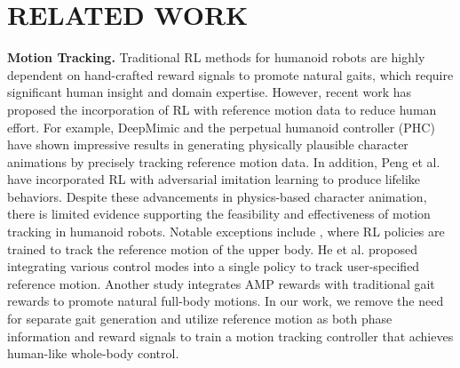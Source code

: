\section{RELATED WORK}
\label{related work}
\textbf{Motion Tracking.} Traditional RL methods for humanoid robots \cite{radosavovic2024real, siekmann2021sim} are highly dependent on hand-crafted reward signals to promote natural gaits, which require significant human insight and domain expertise. However, recent work has proposed the incorporation of RL with reference motion data to reduce human effort. For example, DeepMimic \cite{peng2018deepmimic} and the perpetual humanoid controller (PHC) \cite{luo2023perpetual} have shown impressive results in generating physically plausible character animations by precisely tracking reference motion data. In addition, Peng et al. \cite{peng2021amp, peng2022ase} have incorporated RL with adversarial imitation learning to produce lifelike behaviors. Despite these advancements in physics-based character animation, there is limited evidence supporting the feasibility and effectiveness of motion tracking in humanoid robots. Notable exceptions include \cite{cheng2024expressive}, where RL policies are trained to track the reference motion of the upper body. He et al. \cite{he2024hover} proposed integrating various control modes into a single policy to track user-specified reference motion. Another study \cite{zhang2024whole} integrates AMP rewards with traditional gait rewards to promote natural full-body motions. In our work, we remove the need for separate gait generation and utilize reference motion as both phase information and reward signals to train a motion tracking controller that achieves human-like whole-body control.


